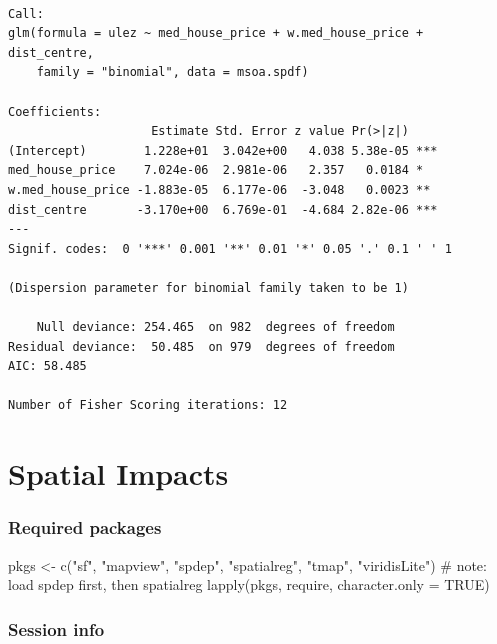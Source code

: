 \documentclass[
  letterpaper,
]{scrbook}
\newenvironment{Shaded}{\begin{snugshade}}{\end{snugshade}}
\newcommand{\AttributeTok}[1]{\textcolor[rgb]{0.40,0.45,0.13}{#1}}
\newcommand{\CommentTok}[1]{\textcolor[rgb]{0.37,0.37,0.37}{#1}}
\newcommand{\ConstantTok}[1]{\textcolor[rgb]{0.56,0.35,0.01}{#1}}
\newcommand{\FunctionTok}[1]{\textcolor[rgb]{0.28,0.35,0.67}{#1}}
\newcommand{\NormalTok}[1]{\textcolor[rgb]{0.00,0.23,0.31}{#1}}
\newcommand{\OtherTok}[1]{\textcolor[rgb]{0.00,0.23,0.31}{#1}}
\newcommand{\StringTok}[1]{\textcolor[rgb]{0.13,0.47,0.30}{#1}}
\begin{document}
\begin{verbatim}

Call:
glm(formula = ulez ~ med_house_price + w.med_house_price + dist_centre, 
    family = "binomial", data = msoa.spdf)

Coefficients:
                    Estimate Std. Error z value Pr(>|z|)    
(Intercept)        1.228e+01  3.042e+00   4.038 5.38e-05 ***
med_house_price    7.024e-06  2.981e-06   2.357   0.0184 *  
w.med_house_price -1.883e-05  6.177e-06  -3.048   0.0023 ** 
dist_centre       -3.170e+00  6.769e-01  -4.684 2.82e-06 ***
---
Signif. codes:  0 '***' 0.001 '**' 0.01 '*' 0.05 '.' 0.1 ' ' 1

(Dispersion parameter for binomial family taken to be 1)

    Null deviance: 254.465  on 982  degrees of freedom
Residual deviance:  50.485  on 979  degrees of freedom
AIC: 58.485

Number of Fisher Scoring iterations: 12
\end{verbatim}


\hypertarget{spatial-impacts}{%
\chapter{Spatial Impacts}\label{spatial-impacts}}

\hypertarget{required-packages-8}{%
\subsection*{Required packages}\label{required-packages-8}}

\begin{Shaded}
\begin{Highlighting}[]
\NormalTok{pkgs }\OtherTok{\textless{}{-}} \FunctionTok{c}\NormalTok{(}\StringTok{"sf"}\NormalTok{, }\StringTok{"mapview"}\NormalTok{, }\StringTok{"spdep"}\NormalTok{, }\StringTok{"spatialreg"}\NormalTok{, }\StringTok{"tmap"}\NormalTok{, }\StringTok{"viridisLite"}\NormalTok{) }\CommentTok{\# note: load spdep first, then spatialreg}
\FunctionTok{lapply}\NormalTok{(pkgs, require, }\AttributeTok{character.only =} \ConstantTok{TRUE}\NormalTok{)}
\end{Highlighting}
\end{Shaded}

\hypertarget{session-info-8}{%
\subsection*{Session info}\label{session-info-8}}
\end{document}
